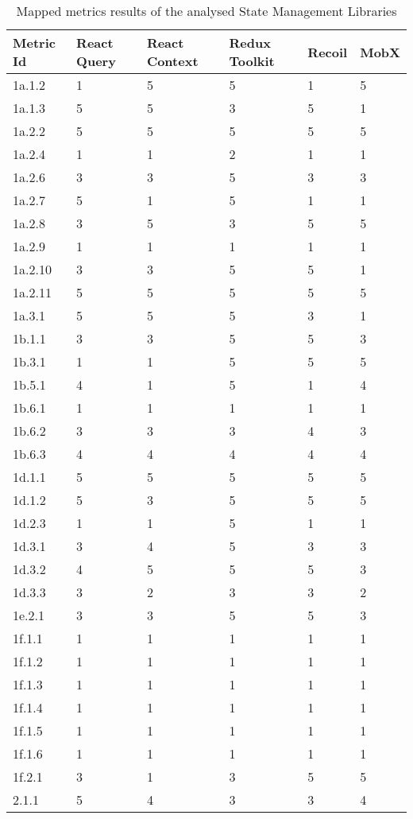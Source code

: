\begin{longtable}[]{|p{1.5cm}p{2.25cm}p{2.25cm}p{2.25cm}p{2.25cm}p{2cm}|}
    \caption{Mapped metrics results of the analysed State Management Libraries}
    \label{table:results_metrics_mapped}\\
    \toprule
Metric Id & React Query & React Context &
Redux Toolkit & Recoil & MobX \\
\midrule
\endhead
1a.1.2 & 1 & 5 & 5 & 1 & 5 \\
1a.1.3 & 5 & 5 & 3 & 5 & 1 \\
1a.2.2 & 5 & 5 & 5 & 5 & 5 \\
1a.2.4 & 1 & 1 & 2 & 1 & 1 \\
1a.2.6 & 3 & 3 & 5 & 3 & 3 \\
1a.2.7 & 5 & 1 & 5 & 1 & 1 \\
1a.2.8 & 3 & 5 & 3 & 5 & 5 \\
1a.2.9 & 1 & 1 & 1 & 1 & 1 \\
1a.2.10 & 3 & 3 & 5 & 5 & 1 \\
1a.2.11 & 5 & 5 & 5 & 5 & 5 \\
1a.3.1 & 5 & 5 & 5 & 3 & 1 \\
1b.1.1 & 3 & 3 & 5 & 5 & 3 \\
1b.3.1 & 1 & 1 & 5 & 5 & 5 \\
1b.5.1 & 4 & 1 & 5 & 1 & 4 \\
1b.6.1 & 1 & 1 & 1 & 1 & 1 \\
1b.6.2 & 3 & 3 & 3 & 4 & 3 \\
1b.6.3 & 4 & 4 & 4 & 4 & 4 \\
1d.1.1 & 5 & 5 & 5 & 5 & 5 \\
1d.1.2 & 5 & 3 & 5 & 5 & 5 \\
1d.2.3 & 1 & 1 & 5 & 1 & 1 \\
1d.3.1 & 3 & 4 & 5 & 3 & 3 \\
1d.3.2 & 4 & 5 & 5 & 5 & 3 \\
1d.3.3 & 3 & 2 & 3 & 3 & 2 \\
1e.2.1 & 3 & 3 & 5 & 5 & 3 \\
1f.1.1 & 1 & 1 & 1 & 1 & 1 \\
1f.1.2 & 1 & 1 & 1 & 1 & 1 \\
1f.1.3 & 1 & 1 & 1 & 1 & 1 \\
1f.1.4 & 1 & 1 & 1 & 1 & 1 \\
1f.1.5 & 1 & 1 & 1 & 1 & 1 \\
1f.1.6 & 1 & 1 & 1 & 1 & 1 \\
1f.2.1 & 3 & 1 & 3 & 5 & 5 \\
2.1.1 & 5 & 4 & 3 & 3 & 4 \\

\end{longtable}

